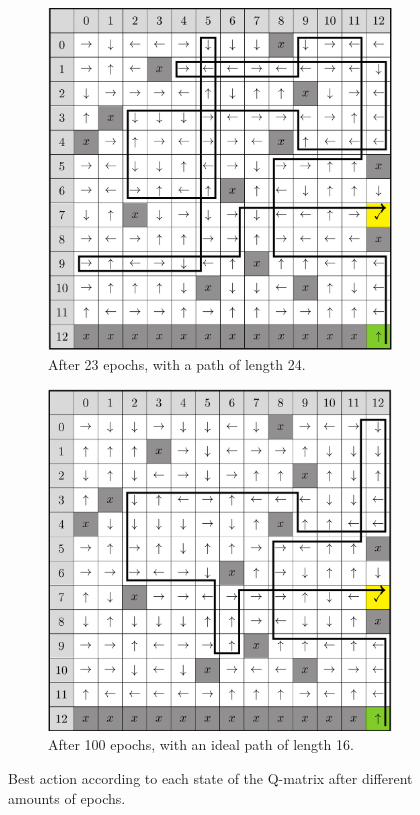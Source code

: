 \renewcommand{\textuparrow}{\ensuremath{\upa{}}}
\renewcommand{\textdownarrow}{\ensuremath{\downa{}}}
\renewcommand{\textleftarrow}{\ensuremath{\lefta{}}}
\renewcommand{\textrightarrow}{\ensuremath{\righta{}}}
\begin{figure}[H]
	\centering
	\begin{subfigure}{.42\textwidth}
		\includegraphics[width=\textwidth]{bad_map.png}
		\caption{After 23 epochs, with a path of length 24.}
	\end{subfigure}
	\begin{subfigure}{.42\textwidth}
		\includegraphics[width=\textwidth]{good_map.png}
		\caption{After 100 epochs, with an ideal path of length 16.}
	\end{subfigure}
	\caption{Best action according to each state of the Q-matrix after different amounts of epochs.}
\end{figure}
